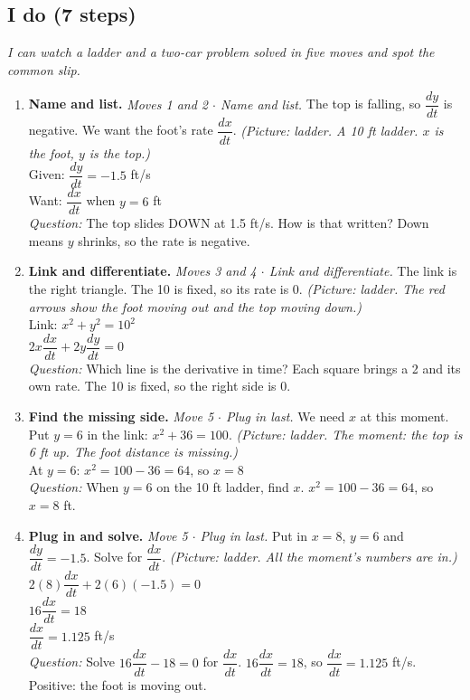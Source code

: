 \documentclass[11pt]{article}
\begin{document}
\subsection*{I do (7 steps)}
\textit{I can watch a ladder and a two-car problem solved in five moves and spot the common slip.}\par
\begin{enumerate}
\item \textbf{Name and list.} \textit{Moves 1 and 2 $\cdot$ Name and list.} The top is falling, so $\dfrac{dy}{dt}$ is negative. We want the foot's rate $\dfrac{dx}{dt}$. \textit{(Picture: ladder. A 10 ft ladder. $x$ is the foot, $y$ is the top.)}\\ Given: $\dfrac{dy}{dt}=-1.5$ ft/s\\ Want: $\dfrac{dx}{dt}$ when $y=6$ ft\\ \textit{Question:} The top slides DOWN at 1.5 ft/s. How is that written?  Down means $y$ shrinks, so the rate is negative.
\item \textbf{Link and differentiate.} \textit{Moves 3 and 4 $\cdot$ Link and differentiate.} The link is the right triangle. The 10 is fixed, so its rate is 0. \textit{(Picture: ladder. The red arrows show the foot moving out and the top moving down.)}\\ Link: $x^2+y^2=10^2$\\ $2x\dfrac{dx}{dt}+2y\dfrac{dy}{dt}=0$\\ \textit{Question:} Which line is the derivative in time?  Each square brings a 2 and its own rate. The 10 is fixed, so the right side is 0.
\item \textbf{Find the missing side.} \textit{Move 5 $\cdot$ Plug in last.} We need $x$ at this moment. Put $y=6$ in the link: $x^2+36=100$. \textit{(Picture: ladder. The moment: the top is 6 ft up. The foot distance is missing.)}\\ At $y=6$: $x^2=100-36=64$, so $x=8$\\ \textit{Question:} When $y=6$ on the 10 ft ladder, find $x$.  $x^2=100-36=64$, so $x=8$ ft.
\item \textbf{Plug in and solve.} \textit{Move 5 $\cdot$ Plug in last.} Put in $x=8$, $y=6$ and $\dfrac{dy}{dt}=-1.5$. Solve for $\dfrac{dx}{dt}$. \textit{(Picture: ladder. All the moment's numbers are in.)}\\ $2(8)\dfrac{dx}{dt}+2(6)(-1.5)=0$\\ $16\dfrac{dx}{dt}=18$\\ $\dfrac{dx}{dt}=1.125$ ft/s\\ \textit{Question:} Solve $16\dfrac{dx}{dt}-18=0$ for $\dfrac{dx}{dt}$.  $16\dfrac{dx}{dt}=18$, so $\dfrac{dx}{dt}=1.125$ ft/s. Positive: the foot is moving out.

\end{enumerate}
\end{document}
